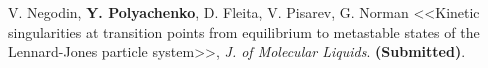 

\vspace{4mm}

\begin{cvenum}

	\item V. Negodin, \textbf{Y. Polyachenko}, D. Fleita, V. Pisarev, G. Norman <<Kinetic singularities at transition points from equilibrium to metastable states of the Lennard-Jones particle system>>, \textit{J. of Molecular Liquids}. \textbf{(Submitted)}.

\end{cvenum}


\vspace{3mm}

